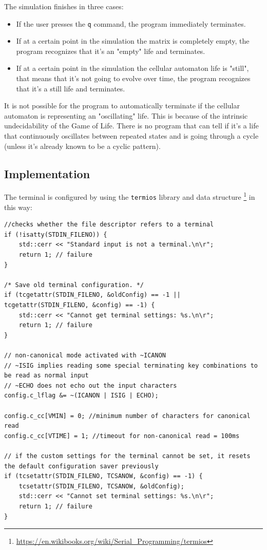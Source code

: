\documentclass[10pt]{article}
\begin{document}
The simulation finishes in three cases:
\begin{itemize}
    \item If the user presses the \verb|q| command, the program immediately terminates.
    \item If at a certain point in the simulation the matrix is completely empty, the program recognizes that it's an "empty" life and terminates.
    \item If at a certain point in the simulation the cellular automaton life is "still", that means that it's not going to evolve over time, the program recognizes that it's a still life and terminates.
\end{itemize}

It is not possible for the program to automatically terminate if the cellular automaton is representing an "oscillating" life. This is because of the intrinsic undecidability of the Game of Life. 
There is no program that can tell if it's a life that continuously oscillates between repeated states and is going through a cycle (unless it's already known to be a cyclic pattern).

\subsection{Implementation}
The terminal is configured by using the \verb|termios| library and data structure \footnote{\url{https://en.wikibooks.org/wiki/Serial\_Programming/termios}} in this way:
\begin{verbatim}
//checks whether the file descriptor refers to a terminal
if (!isatty(STDIN_FILENO)) {
	std::cerr << "Standard input is not a terminal.\n\r";
	return 1; // failure
}

/* Save old terminal configuration. */
if (tcgetattr(STDIN_FILENO, &oldConfig) == -1 || tcgetattr(STDIN_FILENO, &config) == -1) {
	std::cerr << "Cannot get terminal settings: %s.\n\r";
	return 1; // failure
}

// non-canonical mode activated with ~ICANON
// ~ISIG implies reading some special terminating key combinations to be read as normal input
// ~ECHO does not echo out the input characters
config.c_lflag &= ~(ICANON | ISIG | ECHO);

config.c_cc[VMIN] = 0; //minimum number of characters for canonical read
config.c_cc[VTIME] = 1; //timeout for non-canonical read = 100ms

// if the custom settings for the terminal cannot be set, it resets the default configuration saver previously
if (tcsetattr(STDIN_FILENO, TCSANOW, &config) == -1) {
	tcsetattr(STDIN_FILENO, TCSANOW, &oldConfig);
	std::cerr << "Cannot set terminal settings: %s.\n\r";
	return 1; // failure
}

\end{verbatim}
\end{document}
